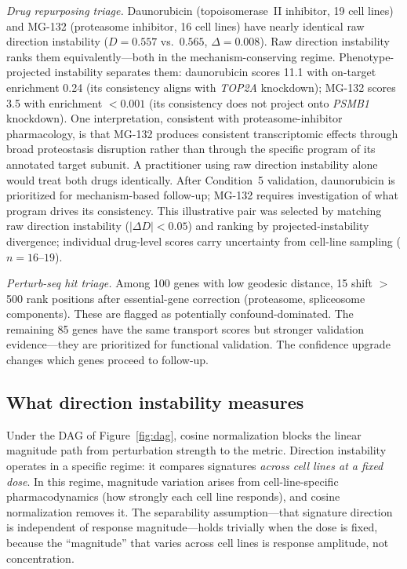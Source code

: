 \documentclass[11pt]{article}
\begin{document}
\emph{Drug repurposing triage.} Daunorubicin (topoisomerase~II inhibitor,
19 cell lines) and MG-132 (proteasome inhibitor, 16 cell lines) have
nearly identical raw direction instability ($D = 0.557$ vs.\ $0.565$,
$\Delta = 0.008$). Raw direction instability ranks them equivalently---both in the
mechanism-conserving regime. Phenotype-projected instability separates them:
daunorubicin scores 11.1 with on-target enrichment 0.24 (its consistency
aligns with \emph{TOP2A} knockdown); MG-132 scores 3.5 with enrichment
$< 0.001$ (its consistency does not project onto \emph{PSMB1} knockdown).
One interpretation, consistent with proteasome-inhibitor pharmacology, is
that MG-132 produces consistent transcriptomic effects through broad
proteostasis disruption rather than through the specific program of its
annotated target subunit. A practitioner using raw direction instability alone would
treat both drugs identically. After Condition~5 validation, daunorubicin is
prioritized for mechanism-based follow-up; MG-132 requires investigation
of what program drives its consistency. This illustrative pair was selected
by matching raw direction instability ($|\Delta D| < 0.05$) and ranking by projected-instability
divergence; individual drug-level scores carry uncertainty from cell-line
sampling ($n = 16$--$19$).

\emph{Perturb-seq hit triage.} Among 100 genes with low geodesic
distance, 15 shift $>$500 rank positions after essential-gene correction
(proteasome, spliceosome components). These are flagged as potentially
confound-dominated. The remaining 85 genes have the same transport
scores but stronger validation evidence---they are prioritized for functional
validation. The confidence upgrade changes which genes proceed to follow-up.

\subsection{What direction instability measures}

Under the DAG of Figure~\ref{fig:dag}, cosine normalization blocks the
linear magnitude path from perturbation strength to the metric. Direction
instability operates in a specific regime: it compares signatures
\emph{across cell lines at a fixed dose}. In this regime, magnitude
variation arises from cell-line-specific pharmacodynamics (how strongly
each cell line responds), and cosine normalization removes it. The
separability assumption---that signature direction is independent of
response magnitude---holds trivially when the dose is fixed, because
the ``magnitude'' that varies across cell lines is response amplitude,
not concentration.
\end{document}
